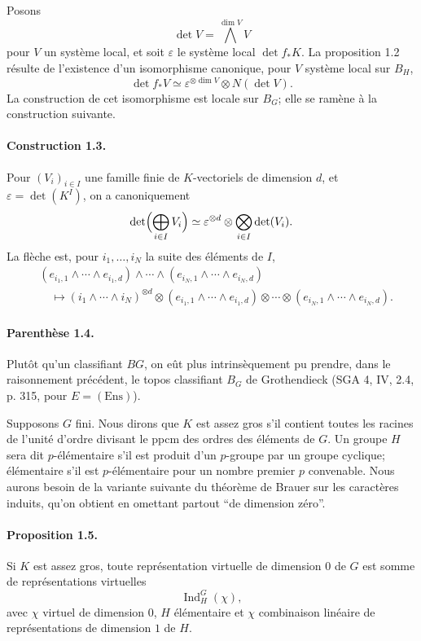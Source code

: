 \documentclass[10pt]{article}
\newcommand{\Ind}{\operatorname{Ind}}
\providecommand{\Ind}{\operatorname{Ind}}
\begin{document}
Posons
\[
\det V=\bigwedge^{\dim V}V
\]
pour \(V\) un système local, et soit \(\varepsilon\) le système local \(\det f_*K\). La proposition 1.2 résulte de l'existence d'un isomorphisme canonique, pour \(V\) système local sur \(B_H\),
\[
\det f_*V\simeq \varepsilon^{\otimes\dim V}\otimes N(\det V).
\]
La construction de cet isomorphisme est locale sur \(B_G\); elle se ramène à la construction suivante.

\paragraph{Construction 1.3.} Pour \((V_i)_{i\in I}\) une famille finie de \(K\)-vectoriels de dimension \(d\), et \(\varepsilon=\det(K^I)\), on a canoniquement
\[
\det\Bigl(\bigoplus_{i\in I}V_i\Bigr)\simeq
\varepsilon^{\otimes d}\otimes\bigotimes_{i\in I}\det(V_i).
\]
La flèche est, pour \(i_1,\ldots,i_N\) la suite des éléments de \(I\),
\[
\begin{aligned}
&(e_{i_1,1}\wedge\cdots\wedge e_{i_1,d})\wedge\cdots\wedge
(e_{i_N,1}\wedge\cdots\wedge e_{i_N,d}) \\
&\quad\longmapsto
(i_1\wedge\cdots\wedge i_N)^{\otimes d}\otimes
(e_{i_1,1}\wedge\cdots\wedge e_{i_1,d})\otimes\cdots\otimes
(e_{i_N,1}\wedge\cdots\wedge e_{i_N,d}).
\end{aligned}
\]

\paragraph{Parenthèse 1.4.} Plutôt qu'un classifiant \(BG\), on eût plus intrinsèquement pu prendre, dans le raisonnement précédent, le topos classifiant \(B_G\) de Grothendieck (SGA 4, IV, 2.4, p. 315, pour \(E=(\mathrm{Ens})\)).

Supposons \(G\) fini. Nous dirons que \(K\) est assez gros s'il contient toutes les racines de l'unité d'ordre divisant le ppcm des ordres des éléments de \(G\). Un groupe \(H\) sera dit \(p\)-élémentaire s'il est produit d'un \(p\)-groupe par un groupe cyclique; élémentaire s'il est \(p\)-élémentaire pour un nombre premier \(p\) convenable. Nous aurons besoin de la variante suivante du théorème de Brauer sur les caractères induits, qu'on obtient en omettant partout ``de dimension zéro''.

\paragraph{Proposition 1.5.} Si \(K\) est assez gros, toute représentation virtuelle de dimension \(0\) de \(G\) est somme de représentations virtuelles
\[
\Ind_H^G(\chi),
\]
avec \(\chi\) virtuel de dimension \(0\), \(H\) élémentaire et \(\chi\) combinaison linéaire de représentations de dimension \(1\) de \(H\).
\end{document}
